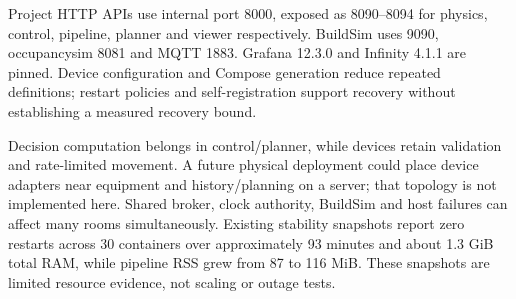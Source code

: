 \documentclass[11pt,a4paper]{article}
\begin{document}
Project HTTP APIs use internal port 8000, exposed as 8090--8094 for physics, control, pipeline, planner and viewer respectively. BuildSim uses 9090, occupancysim 8081 and MQTT 1883. Grafana 12.3.0 and Infinity 4.1.1 are pinned. Device configuration and Compose generation reduce repeated definitions; restart policies and self-registration support recovery without establishing a measured recovery bound.

Decision computation belongs in control/planner, while devices retain validation and rate-limited movement. A future physical deployment could place device adapters near equipment and history/planning on a server; that topology is not implemented here. Shared broker, clock authority, BuildSim and host failures can affect many rooms simultaneously. Existing stability snapshots report zero restarts across 30 containers over approximately 93 minutes and about 1.3 GiB total RAM, while pipeline RSS grew from 87 to 116 MiB. These snapshots are limited resource evidence, not scaling or outage tests.
\end{document}
